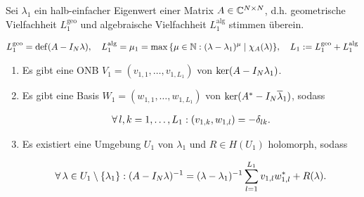 \begin{theorem} \label{keldysh_linear}
    
    Sei $\lambda_1$ ein halb-einfacher Eigenwert einer Matrix $A \in \mathbb{C}^{N \times N}$, d.h. geometrische Vielfachheit $L_1^\mathrm{geo}$ und algebraische Vielfachheit $L_1^\mathrm{alg}$ stimmen überein.

    \begin{align*}
        L_1^\mathrm{geo} = \operatorname{def}(A - I_N \lambda),
        \quad
        L_1^\mathrm{alg} = \mu_1 = \max {\left \{ \mu \in \mathbb{N}: (\lambda - \lambda_1)^\mu \mid \chi_A(\lambda) \right \}},
        \quad
        L_1 := L_1^\mathrm{geo} + L_1^\mathrm{alg}
    \end{align*}

    \begin{enumerate}[label = (\roman*)]

        \item Es gibt eine ONB $V_1 = (v_{1, 1}, \dots, v_{1, L_1})$ von $\operatorname{ker}(A - I_N \lambda_1)$.

        \item Es gibt eine Basis $W_1 = (w_{1, 1}, \dots, w_{1, L_1})$ von $\operatorname{ker}(A^\ast - I_N \overline \lambda_1)$, sodass
        
        \begin{align*}
            \forall \, l, k = 1, \dots, L_1:
            (v_{1, k}, w_{1, l}) = -\delta_{l k}.
        \end{align*}

        \item Es existiert eine Umgebung $U_1$ von $\lambda_1$ und $R \in H(U_1)$ holomorph, sodass
        
        \begin{align*}
            \forall \, \lambda \in U_1 \setminus {\left \{ \lambda_1 \right \}}:
            (A - I_N \lambda)^{-1}
            =
            (\lambda - \lambda_1)^{-1}
            \sum_{l=1}^{L_1}
                v_{1, l} w_{1, l}^\ast
            +
            R(\lambda).
        \end{align*}

    \end{enumerate}

\end{theorem}

